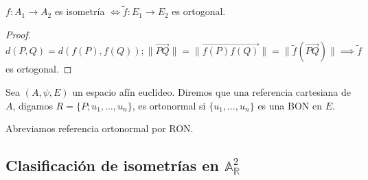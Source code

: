 \documentclass[14pt]{book}
\begin{document}
\begin{obs}
	$f: A_1 \to A_2$ es isometría $\iff \tilde{f}: E_1 \to E_2$ es ortogonal.
\end{obs}
\begin{proof}
	$d(P, Q) = d(f(P), f(Q)); \lVert \overrightarrow{PQ} \rVert = \lVert \overrightarrow{f(P) f(Q)}\rVert = \lVert\tilde{f}(\overrightarrow{PQ})\rVert \implies \tilde{f}$ es ortogonal.
\end{proof}

\begin{dfn}
	Sea $(A, \psi, E)$ un espacio afín euclídeo. Diremos que una referencia cartesiana de $A$, digamos $R = \{P; u_1, \dots, u_n\}$, es ortonormal si $\{u_1, \dots, u_n\}$ es una BON en $E$.
	
	Abreviamos referencia ortonormal por RON.
\end{dfn}

\subsection{Clasificación de isometrías en $\mathbb{A}_\mathbb{R}^2$}
\end{document}

